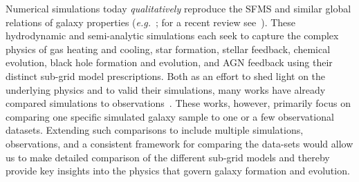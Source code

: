 \documentclass[preprint2,tighten]{aastex62}
\newcommand{\todo}[1]{{\bf \textcolor{red}{ #1}}}
\begin{document}
Numerical simulations today \emph{qualitatively} reproduce the SFMS and 
similar global relations of galaxy properties 
(\emph{e.g.}~\citealt{ vogelsberger2014,genel2014, schaye2015, dave2017}; 
for a recent review see~\citealt{somerville2015}). These hydrodynamic and 
semi-analytic simulations each seek to capture the complex physics of 
gas heating and cooling, star formation, stellar feedback, chemical 
evolution, black hole formation and evolution, and AGN feedback using 
their distinct sub-grid model prescriptions. Both as an effort to shed 
light on the underlying physics and to valid their simulations, many 
works have already compared simulations to 
observations~\citep[\emph{e.g.}][]{vogelsberger2014, 
genel2014, torrey2014, sparre2015, schaye2015, bluck2016, dave2017}. 
These works, however, primarily focus on comparing one specific simulated 
galaxy sample to one or a few observational datasets. Extending such 
comparisons to include multiple simulations, observations, and a 
consistent framework for comparing the data-sets would allow us to make 
detailed comparison of the different sub-grid models and thereby provide 
key insights into the physics that govern galaxy formation and evolution.  

\end{document}
